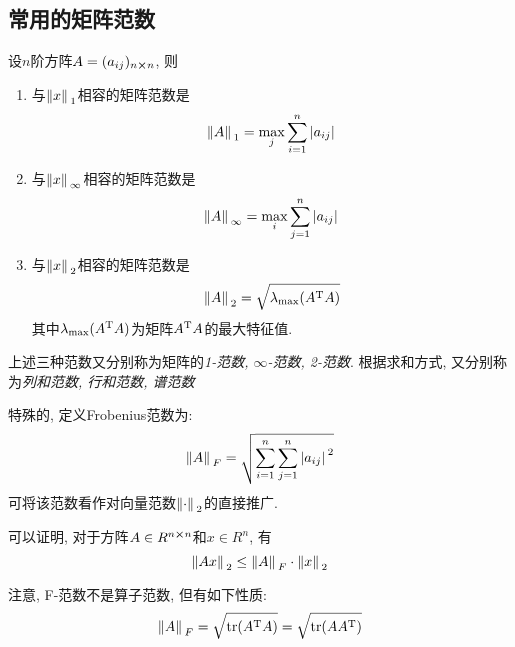 \subsection{常用的矩阵范数}

\begin{theorem}
    设$n$阶方阵$A=(a_{ij})_{n\cross n}$, 则
    \begin{enumerate}
        \item 与$\norm*{x}_1$相容的矩阵范数是
        \begin{equation*}
            \norm*{A}_1=\max_j\sum_{i=1}^n\abs*{a_{ij}}
        \end{equation*}
        \item 与$\norm*{x}_\infty$相容的矩阵范数是
        \begin{equation*}
            \norm*{A}_\infty=\max_i\sum_{j=1}^n\abs*{a_{ij}}
        \end{equation*}
        \item 与$\norm*{x}_2$相容的矩阵范数是
        \begin{equation*}
            \norm*{A}_2=\sqrt{\lambda_\text{max}(A^\text{T}A)}
        \end{equation*}
        其中$\lambda_\text{max}(A^\text{T}A)$为矩阵$A^\text{T}A$的最大特征值.
    \end{enumerate}
\end{theorem}

上述三种范数又分别称为矩阵的\emph{1-范数, $\infty$-范数, 2-范数}. 根据求和方式, 又分别称为\emph{列和范数, 行和范数, 谱范数}

特殊的, 定义Frobenius范数为:
\begin{equation*}
    \norm*{A}_F=\sqrt{\sum_{i=1}^n\sum_{j=1}^n\abs*{a_{ij}}^2}
\end{equation*}
可将该范数看作对向量范数$\norm*{\cdot}_2$的直接推广.

可以证明, 对于方阵$A\in R^{n\cross n}$和$x\in R^n$, 有
\begin{equation*}
    \norm*{Ax}_2\le\norm*{A}_F\cdot\norm*{x}_2
\end{equation*}

注意, F-范数不是算子范数, 但有如下性质:
\begin{equation*}
    \norm*{A}_F=\sqrt{\tr(A^\text{T}A)}=\sqrt{\tr(AA^\text{T})}
\end{equation*}

